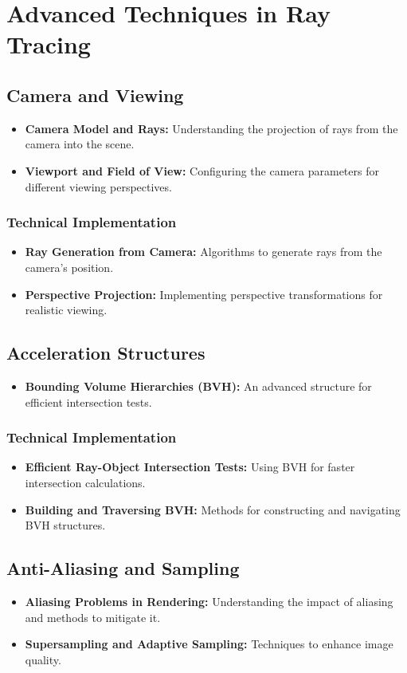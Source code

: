 \documentclass[12pt]{article}
\begin{document}
\section{Advanced Techniques in Ray Tracing}
\label{sec:advanced}
\subsection{Camera and Viewing}
\begin{itemize}
    \item \textbf{Camera Model and Rays:} Understanding the projection of rays from the camera into the scene.
    \item \textbf{Viewport and Field of View:} Configuring the camera parameters for different viewing perspectives.
\end{itemize}
\subsubsection{Technical Implementation}
\begin{itemize}
    \item \textbf{Ray Generation from Camera:} Algorithms to generate rays from the camera's position.
    \item \textbf{Perspective Projection:} Implementing perspective transformations for realistic viewing.
\end{itemize}
\subsection{Acceleration Structures}
\begin{itemize}
    \item \textbf{Bounding Volume Hierarchies (BVH):} An advanced structure for efficient intersection tests.
\end{itemize}
\subsubsection{Technical Implementation}
\begin{itemize}
    \item \textbf{Efficient Ray-Object Intersection Tests:} Using BVH for faster intersection calculations.
    \item \textbf{Building and Traversing BVH:} Methods for constructing and navigating BVH structures.
\end{itemize}
\subsection{Anti-Aliasing and Sampling}
\begin{itemize}
    \item \textbf{Aliasing Problems in Rendering:} Understanding the impact of aliasing and methods to mitigate it.
    \item \textbf{Supersampling and Adaptive Sampling:} Techniques to enhance image quality.
\end{itemize}
\end{document}
